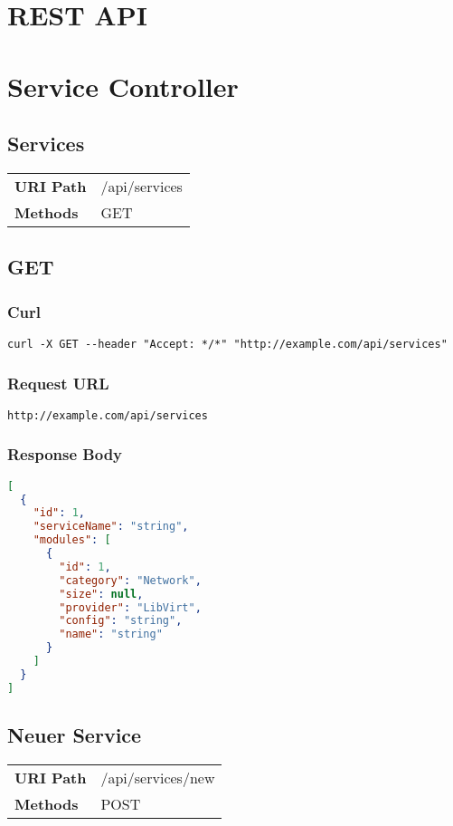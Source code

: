 \section{REST API}

\section{Service Controller}
\subsection{Services}
\begin{tabularx}{\linewidth}{l l}
\textbf{URI Path} & /api/services\\
\textbf{Methods} & GET\\
\end{tabularx}

\subsection{GET}

\subsubsection{Curl}
\begin{lstlisting}[style=Bash] 
curl -X GET --header "Accept: */*" "http://example.com/api/services"
\end{lstlisting}
\subsubsection{Request URL}
\begin{lstlisting}[] 
http://example.com/api/services
\end{lstlisting}

\subsubsection{Response Body}
\begin{lstlisting}[language=json] 
[
  {
    "id": 1,
    "serviceName": "string",
    "modules": [
      {
        "id": 1,
        "category": "Network",
        "size": null,
        "provider": "LibVirt",
        "config": "string",
        "name": "string"
      }
    ]
  }
]
\end{lstlisting}


\subsection{Neuer Service}
\begin{tabularx}{\linewidth}{l l}
\textbf{URI Path} & /api/services/new\\
\textbf{Methods} & POST\\
\end{tabularx}

